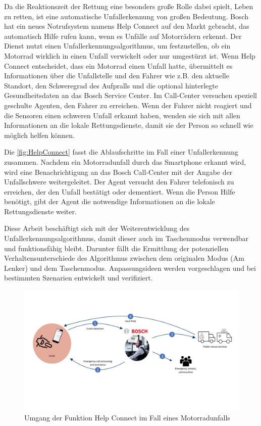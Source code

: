 Da die Reaktionszeit der Rettung eine besonders große Rolle dabei spielt, Leben zu retten, ist eine automatische Unfallerkennung von großen Bedeutung.
Bosch hat ein neues Notrufsystem namens \glqq Help Connect\grqq{} auf den Markt gebracht, das automatisch Hilfe rufen kann, wenn es Unfälle auf Motorrädern erkennt.
Der Dienst nutzt einen Unfallerkennungsalgorithmus, um festzustellen, ob ein Motorrad wirklich in einen Unfall verwickelt oder nur umgestürzt ist.
Wenn \glqq Help Connect\grqq{} entscheidet, dass ein Motorrad einen Unfall hatte, übermittelt es Informationen über die Unfallstelle und den Fahrer wie z.B. den aktuelle Standort, den Schweregrad des Aufpralls und die optional hinterlegte Gesundheitsdaten an das Bosch Service Center.
Im Call-Center versuchen speziell geschulte Agenten, den Fahrer zu erreichen. Wenn der Fahrer nicht reagiert und die Sensoren einen schweren Unfall erkannt haben, wenden sie sich mit allen Informationen an die lokale Rettungsdienste, damit sie der Person so schnell wie möglich helfen können.

Die \autoref{fig:HelpConnect} fasst die Ablaufschritte im Fall einer Unfallerkennung zusammen. Nachdem ein Motorradunfall durch das Smartphone erkannt wird, wird eine Benachrichtigung an das Bosch Call-Center mit der Angabe der Unfallschwere weitergeleitet. Der Agent versucht den Fahrer telefonisch zu erreichen, der den Unfall bestätigt oder dementiert. Wenn die Person Hilfe benötigt, gibt der Agent die notwendige Informationen an die lokale Rettungsdienste weiter.

Diese Arbeit beschäftigt sich mit der Weiterentwicklung des Unfallerkennungsalgorithmus, damit dieser auch im Taschenmodus verwendbar und funktionsfähig bleibt. Darunter fällt die Ermittlung der potenziellen Verhaltensunterschiede des Algorithmus zwischen dem originalen Modus (Am Lenker) und dem Taschenmodus. Anpassungsideen werden vorgeschlagen und bei bestimmten Szenarien entwickelt und verifiziert.

\begin{figure}[htpb]
	\centering
	\includegraphics[width=\linewidth]{Bilder/HelpConnect.pdf}
	\caption{Umgang der Funktion \glqq Help Connect\grqq{} im Fall eines Motorradunfalls}
	\label{fig:HelpConnect}
\end{figure}


